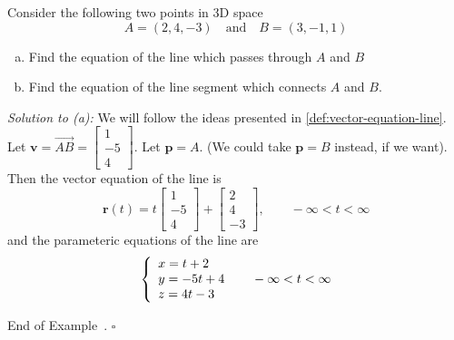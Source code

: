 \documentclass[10pt]{article}
\theoremstyle{definition}
\newtheorem{example}[theorem]{Example}
\renewenvironment{example}
{\begin{oldexample}}
  {\par\smallskip\hfill   End of Example~\theexample. $\square$    \par\end{oldexample}}
\newcommand{\1}[1]{\textbf{1}_{\left[#1\right]}} %
\begin{document}
\begin{example}
  Consider the following two points in 3D space
  \begin{equation*}
    A = (2,4,-3) \quad \text{and} \quad B = (3,-1,1)
  \end{equation*}
  \begin{enumerate}[(a)]
    \item Find the equation of the line which passes through $A$ and $B$
    \item Find the equation of the line segment which connects $A$ and $B$.
  \end{enumerate}

  \textit{Solution to (a):}
  We will follow the ideas presented in \cref{def:vector-equation-line}. Let $\mathbf{v} = \overrightarrow{AB} =
  \begin{bmatrix}
    1\\-5\\4
  \end{bmatrix}
  $. Let $\mathbf{p}=A$. (We could take $\boldsymbol{p}=B$ instead, if we
  want). Then the vector equation of the line is
  \begin{equation*}
    \boldsymbol{r}(t)
    = t
    \begin{bmatrix}
      1\\-5\\4
    \end{bmatrix}
    +
    \begin{bmatrix}
      2\\4\\-3
    \end{bmatrix},
    \qquad -\infty<t<\infty
  \end{equation*}
  and the parameteric equations of the line are
  \begin{equation*}
    \left\{ \begin{array}{l@{}l}
        x=t+2\\
        y=-5t+4\\
        z=4t-3
      \end{array}\right.
    \qquad-\infty<t<\infty
  \end{equation*}


\end{example}
\end{document}
